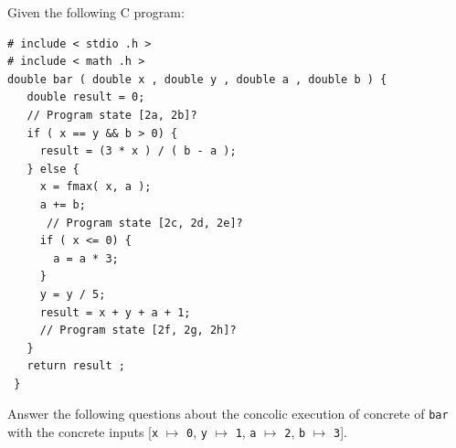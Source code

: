 \documentclass[addpoints, answers]{exam}
\newcommand{\Code}[1]{\texttt{#1}}
\newcommand{\StateQ}[5]{[\Code{x}$\mapsto$\Code{#1},
  \Code{y}$\mapsto$\Code{#2}, \Code{a}$\mapsto$\Code{#3},
  \Code{b}$\mapsto$\Code{#4}, \Code{result}$\mapsto$\Code{#5}]}
\newcommand{\StateS}[5]{[\Code{x}$\mapsto #1$, \Code{y}$\mapsto #2$,
  \Code{a}$\mapsto #3$, \Code{b}$\mapsto #4$,
  \Code{result}$\mapsto #5$]}
\begin{document}
\begin{questions}

\newpage

\question Given the following C program:
  \begin{verbatim}
# include < stdio .h >
# include < math .h >
double bar ( double x , double y , double a , double b ) {
   double result = 0;
   // Program state [2a, 2b]?
   if ( x == y && b > 0) {
     result = (3 * x ) / ( b - a );
   } else {
     x = fmax( x, a );
     a += b;
      // Program state [2c, 2d, 2e]?
     if ( x <= 0) {
       a = a * 3;
     }
     y = y / 5;
     result = x + y + a + 1;
     // Program state [2f, 2g, 2h]?
   }
   return result ;
 }
\end{verbatim}

Answer the following questions about the concolic execution of
concrete of \texttt{bar} with the concrete inputs
[\Code{x} $\mapsto$ \Code{0}, \Code{y} $\mapsto$ \Code{1}, \Code{a} $\mapsto$ \Code{2}, \Code{b} $\mapsto$ \Code{3}].

\end{questions}
\end{document}
